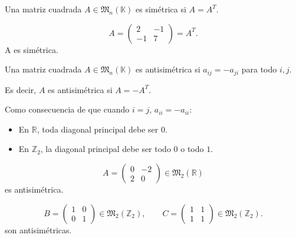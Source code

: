 \documentclass[a4paper,12pt]{article}
\begin{document}
\begin{procedimiento}[title=Matriz simétrica]
Una matriz cuadrada $A \in \mathfrak{M}_n(\mathbb{K})$ es simétrica si $A = A^T$.
\end{procedimiento}

\begin{ejemplo}[title=Ejemplo de matriz simétrica]
\[
A=
\begin{pmatrix}
2 & -1 \\
-1 & 7
\end{pmatrix}
=
A^T.
\]
A es simétrica.
\end{ejemplo}

\begin{procedimiento}[title=Matriz antisimétrica]
Una matriz cuadrada $A \in \mathfrak{M}_n(\mathbb{K})$ es antisimétrica si $a_{ij} = -a_{ji}$ para todo $i,j$.  

Es decir, $A$ es antisimétrica si $A = -A^T$.

\vspace{0.5em}

Como consecuencia de que cuando $i=j$, $a_{ii} = -a_{ii}$:
\begin{itemize}
\item En $\mathbb{R}$, toda diagonal principal debe ser $0$.
\item En $\mathbb{Z}_2$, la diagonal principal debe ser todo $0$ o todo $1$.
\end{itemize}
\end{procedimiento}

\begin{ejemplo}[title=Ejemplo 1 de matriz antisimétrica en $\mathbb{R}$]
\[
A=
\begin{pmatrix}
0 & -2 \\
2 & 0
\end{pmatrix}
\in \mathfrak{M}_2(\mathbb{R})
\]
es antisimétrica.
\end{ejemplo}

\begin{ejemplo}[title=Ejemplo 2 de matriz antisimétrica en $\mathbb{Z}_2$]
\[
B=
\begin{pmatrix}
1 & 0 \\
0 & 1
\end{pmatrix} \in \mathfrak{M}_2(\mathbb{Z}_2), \qquad
C=
\begin{pmatrix}
1 & 1 \\
1 & 1
\end{pmatrix} \in \mathfrak{M}_2(\mathbb{Z}_2).
\]
son antisimétricas.
\end{ejemplo}
\end{document}
